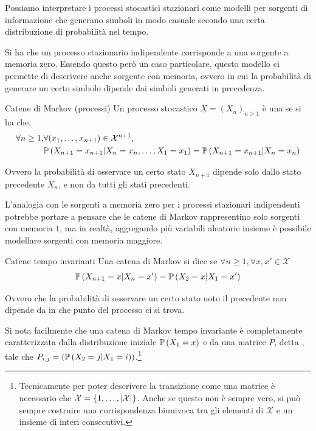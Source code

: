 \begin{note}{}
  Possiamo interpretare i processi stocastici stazionari come modelli per sorgenti di informazione che generano simboli in modo casuale secondo una certa distribuzione di probabilità nel tempo.

  Si ha che un processo stazionario indipendente corrisponde a una sorgente a memoria zero.
  Essendo questo però un caso particolare, questo modello ci permette di descrivere anche sorgente con memoria, ovvero in cui la probabilità di generare un certo simbolo dipende dai simboli generati in precedenza.
\end{note}

\begin{definition}{Catene di Markov (processi)}
  Un processo stocastico \(\underline{X} = {(X_n)}_{n\geq 1}\) è una  se si ha che, 
  \[\begin{aligned}
    \forall n \geq 1, & \forall (x_1, \ldots, x_{n+1}) \in \mathcal{X}^{n+1}, \\
                      & \Prob[X_{n+1} = x_{n+1}|X_n = x_n, \ldots, X_1 = x_1] = \Prob[X_{n+1} = x_{n+1}|X_n = x_n]
  \end{aligned}\]

  Ovvero la probabilità di osservare un certo stato \(X_{n+1}\) dipende solo dallo stato precedente \(X_n\), e non da tutti gli stati precedenti.
\end{definition}

\begin{note}{}
  L'analogia con le sorgenti a memoria zero per i processi stazionari indipendenti potrebbe portare a pensare che le catene di Markov rappresentino solo sorgenti con memoria \(1\), ma in realtà, aggregando più variabili aleatorie insieme è possibile modellare sorgenti con memoria maggiore.
\end{note}

\begin{definition}{Catene tempo invarianti}
    Una catena di Markov si dice  se \(\forall n \geq 1, \forall x,x'\in\mathcal{X}\)
  \[\Prob[X_{n+1} = x | X_n = x'] = \Prob[X_2 = x | X_1 = x']\]
  
  Ovvero che la probabilità di osservare un certo stato noto il precedente non dipende da in che punto del processo ci si trova.
\end{definition}

Si nota facilmente che una catena di Markov tempo invariante è completamente caratterizzata dalla distribuzione iniziale \(\Prob[X_1 = x]\) e da una matrice \(P\), detta , tale che \(P_{i,j} = (\Prob[X_2 = j | X_1 = i])\).\footnote{Tecnicamente per poter descrivere la transizione come una matrice è necessario che \(\mathcal{X} = \set{1, \ldots, \abs{\mathcal{X}}}\). Anche se questo non è sempre vero, si può sempre costruire una corrispondenza biunivoca tra gli elementi di \(\mathcal{X}\) e un insieme di interi consecutivi.}

